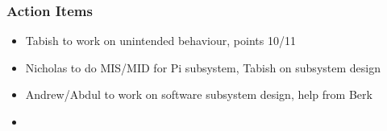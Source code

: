 		\subsubsection*{Action Items}
			\begin{itemize}
				\item Tabish to work on unintended behaviour, points 10/11
				\item Nicholas to do MIS/MID for Pi subsystem, Tabish on subsystem design
				\item Andrew/Abdul to work on software subsystem design, help from Berk
				\item 
			\end{itemize}


